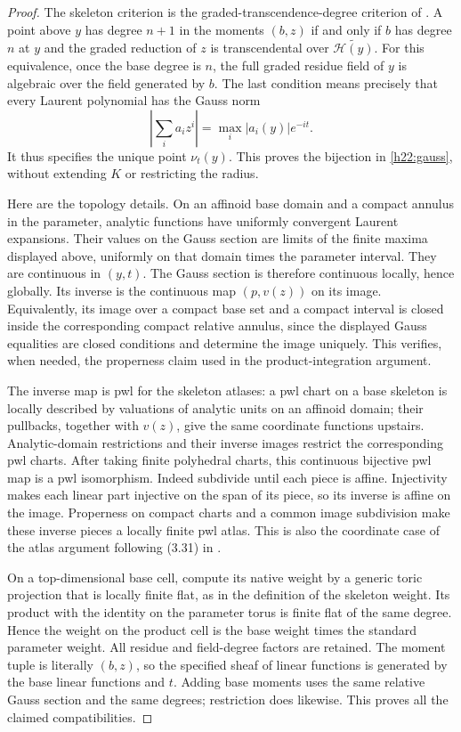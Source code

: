 \documentclass[11pt,a4paper]{article}
\theoremstyle{definition}
\theoremstyle{remark}
\begin{document}
\begin{proof}
The skeleton criterion is the graded-transcendence-degree criterion
of \cite[\S3.1]{MihLT}. A point above $y$ has degree $n+1$ in the
moments $(b,z)$ if and only if $b$ has degree $n$ at $y$ and the
graded reduction of $z$ is transcendental over
$\widetilde{\mathcal H(y)}$. For this equivalence, once the base
degree is $n$, the full graded residue field of $y$ is algebraic over
the field generated by $b$. The last condition means precisely that
every Laurent polynomial has the Gauss norm
\[
 \left|\sum_i a_i z^i\right|=\max_i |a_i(y)|e^{-it}.
\]
It thus specifies the unique point $\nu_t(y)$. This proves the
bijection in \eqref{h22:gauss}, without extending $K$ or restricting the radius.

Here are the topology details. On an affinoid base domain and a
compact annulus in the parameter, analytic functions have uniformly
convergent Laurent expansions. Their values on the Gauss section
are limits of the finite maxima displayed above, uniformly on that
domain times the parameter interval. They are continuous in $(y,t)$.
The Gauss section is therefore continuous locally, hence globally.
Its inverse is the continuous map $(p,v(z))$ on its image.
Equivalently, its image over a compact base set and a compact interval
is closed inside the corresponding compact relative annulus, since
the displayed Gauss equalities are closed conditions and determine
the image uniquely. This verifies, when needed, the properness claim
used in the product-integration argument.

The inverse map is pwl for the skeleton atlases: a pwl chart on a
base skeleton is locally described by valuations of analytic units
on an affinoid domain; their pullbacks, together with $v(z)$, give
the same coordinate functions upstairs. Analytic-domain restrictions
and their inverse images restrict the corresponding pwl charts.
After taking finite polyhedral charts, this continuous bijective pwl
map is a pwl isomorphism. Indeed subdivide until each piece is
affine. Injectivity makes each linear part injective on the span of
its piece, so its inverse is affine on the image. Properness on
compact charts and a common image subdivision make these inverse
pieces a locally finite pwl atlas. This is also the coordinate case
of the atlas argument following (3.31) in \cite{MihLT}.

On a top-dimensional base cell, compute its native weight by a
generic toric projection that is locally finite flat, as in the
definition of the skeleton weight. Its product with the identity
on the parameter torus is finite flat of the same degree. Hence the
weight on the product cell is the base weight times the standard
parameter weight. All residue and field-degree factors are retained.
The moment tuple is literally $(b,z)$, so the specified sheaf of
linear functions is generated by the base linear functions and $t$.
Adding base moments uses the same relative Gauss section and the
same degrees; restriction does likewise. This proves all the claimed
compatibilities.
\end{proof}
\end{document}
